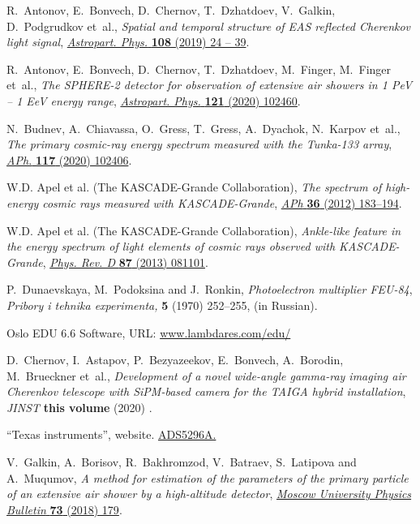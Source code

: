 \documentclass[a4paper,11pt]{article}
\begin{document}
\begin{thebibliography}{10}
R.~Antonov, E.~Bonvech, D.~Chernov, T.~Dzhatdoev, V.~Galkin, D.~Podgrudkov  et~al., \emph{Spatial and temporal structure of EAS reflected Cherenkov light signal}, \href{http://dx.doi.org/10.1016/j.astropartphys.2019.01.002}{\emph{Astropart. Phys.} {\bfseries 108} (2019) 24 -- 39}.

R.~Antonov, E.~Bonvech, D.~Chernov, T.~Dzhatdoev, M.~Finger, M.~Finger et~al., \emph{The SPHERE-2 detector for observation of extensive air showers in 1 PeV -- 1 EeV energy range}, \href{http://dx.doi.org/10.1016/j.astropartphys.2020.102460}{\emph{Astropart. Phys.} {\bfseries 121} (2020) 102460}.

N.~Budnev, A.~Chiavassa, O.~Gress, T.~Gress, A.~Dyachok, N.~Karpov et~al., \emph{The primary cosmic-ray energy spectrum measured with the Tunka-133 array}, \href{http://dx.doi.org/10.1016/j.astropartphys.2019.102406}{\emph{APh.} {\bfseries 117} (2020) 102406}.

{W.D. Apel et al. (The KASCADE-Grande Collaboration)}, \emph{{The spectrum of high-energy cosmic rays measured with KASCADE-Grande}}, \href{https://doi.org/10.1016/j.astropartphys.2012.05.023}{{\emph{APh} {\bfseries 36} (2012) 183--194}}.

{W.D. Apel et al. (The KASCADE-Grande Collaboration)}, \emph{Ankle-like feature in the energy spectrum of light elements of cosmic rays observed with KASCADE-Grande}, \href{https://doi.org/10.1103/PhysRevD.87.081101}{{\emph{Phys. Rev. D} {\bfseries 87} (2013) 081101}}.

P.~Dunaevskaya, M.~Podoksina and J.~Ronkin, \emph{Photoelectron multiplier FEU-84}, {\emph{Pribory i tehnika experimenta,} {\bfseries 5} (1970) 252--255},  (in Russian).

Oslo EDU 6.6 Software, {URL: \href{{}https://www.lambdares.com/edu/}{www.lambdares.com/edu/}}

D.~Chernov, I.~Astapov, P.~Bezyazeekov, E.~Bonvech, A.~Borodin, M.~Brueckner et~al., \emph{Development of a novel wide-angle gamma-ray imaging air Cherenkov telescope with SiPM-based camera for the TAIGA hybrid installation}, {\emph{JINST} {\bfseries this volume} (2020) }.

``Texas instruments'', website. \href{https://www.ti.com/product/ADS5296A}{ADS5296A.}

V.~Galkin, A.~Borisov, R.~Bakhromzod, V.~Batraev, S.~Latipova and A.~Muqumov, \emph{A method for estimation of the parameters of the primary particle of an extensive air shower by a high-altitude detector}, \href{http://dx.doi.org/10.3103/S0027134918020078}{\emph{Moscow University Physics Bulletin} {\bfseries 73} (2018) 179}.


\end{thebibliography}
\end{document}
